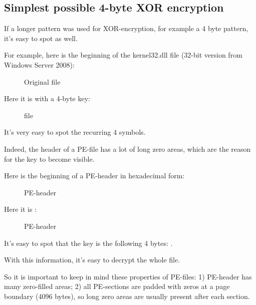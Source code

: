 \clearpage
\subsection{Simplest possible 4-byte XOR encryption}

If a longer pattern was used for XOR-encryption, for example a 4 byte pattern, it's easy to spot as well.

For example, here is the beginning of the kernel32.dll file (32-bit version from Windows Server 2008):

\begin{figure}[H]
\centering
{}
\caption{Original file}
\end{figure}

\clearpage

Here it is  with a 4-byte key:

\begin{figure}[H]
\centering
{}
\caption{ file}
\end{figure}

It's very easy to spot the recurring 4 symbols.

Indeed, the header of a PE-file has a lot of long zero areas, which are the reason for the key to become visible.

\clearpage

Here is the beginning of a PE-header in hexadecimal form:

\begin{figure}[H]
\centering
{}
\caption{PE-header}
\end{figure}

\clearpage

Here it is :

\begin{figure}[H]
\centering
{}
\caption{ PE-header}
\end{figure}

It's easy to spot that the key is the following 4 bytes: .

With this information, it's easy to decrypt the whole file.

So it is important to keep in mind these properties of PE-files:
1) PE-header has many zero-filled areas;
2) all PE-sections are padded with zeros at a page boundary (4096 bytes),
so long zero areas are usually present after each section.

